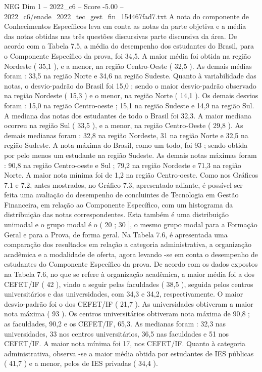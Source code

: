 \begin{textsample}{NEG Dim 1 – 2022\_c6 – Score -5.00 – 2022\_c6/enade\_2022\_tec\_gest\_fin\_154467fad7.txt}
A nota do componente de Conhecimentos Específicos leva em conta as notas da parte objetiva e a média das notas obtidas nas três questões discursivas parte discursiva da área.
De acordo com a Tabela 7.5, a média do desempenho dos estudantes do Brasil, para o Componente Específico da prova, foi 34,5.
A maior média foi obtida na região Nordeste ( 35,1 ), e a menor, na região Centro-Oeste ( 32,5 ).
As demais médias foram : 33,5 na região Norte e 34,6 na região Sudeste.
Quanto à variabilidade das notas, o desvio-padrão do Brasil foi 15,0 ; sendo o maior desvio-padrão observado na região Nordeste ( 15,3 ) e o menor, na região Norte ( 14,1 ).
Os demais desvios foram : 15,0 na região Centro-oeste ; 15,1 na região Sudeste e 14,9 na região Sul.
A mediana das notas dos estudantes de todo o Brasil foi 32,3.
A maior mediana ocorreu na região Sul ( 33,5 ), e a menor, na região Centro-Oeste ( 29,8 ).
As demais medianas foram : 32,8 na região Nordeste, 31 na região Norte e 32,5 na região Sudeste.
A nota máxima do Brasil, como um todo, foi 93 ; sendo obtida por pelo menos um estudante na região Sudeste.
As demais notas máximas foram : 90,8 na região Centro-oeste e Sul ; 79,2 na região Nordeste e 71,3 na região Norte.
A maior nota mínima foi de 1,2 na região Centro-oeste.
Como nos Gráficos 7.1 e 7.2, antes mostrados, no Gráfico 7.3, apresentado adiante, é possível ser feita uma avaliação do desempenho de concluintes de Tecnologia em Gestão Financeira, em relação ao Componente Específico, com um histograma da distribuição das notas correspondentes.
Esta também é uma distribuição unimodal e o grupo modal é o ( 20 ; 30 ], o mesmo grupo modal para a Formação Geral e para a Prova, de forma geral.
Na Tabela 7.6, é apresentada uma comparação dos resultados em relação a categoria administrativa, a organização acadêmica e a modalidade de oferta, agora levando -se em conta o desempenho de estudantes do Componente Específico da prova.
De acordo com os dados expostos na Tabela 7.6, no que se refere à organização acadêmica, a maior média foi a dos CEFET/IF ( 42 ), vindo a seguir pelas faculdades ( 38,5 ), seguida pelos centros universitários e das universidades, com 34,3 e 34,2, respectivamente.
O maior desvio-padrão foi o dos CEFET/IF ( 21,7 ).
As universidades obtiveram a maior nota máxima ( 93 ).
Os centros universitários obtiveram nota máxima de 90,8 ; as faculdades, 90,2 e os CEFET/IF, 65,3.
As medianas foram : 32,3 nas universidades, 33 nos centros universitários, 36,5 nas faculdades e 51 nos CEFET/IF.
A maior nota mínima foi 17, nos CEFET/IF.
Quanto à categoria administrativa, observa -se a maior média obtida por estudantes de IES públicas ( 41,7 ) e a menor, pelos de IES privadas ( 34,4 ).

\end{textsample}
